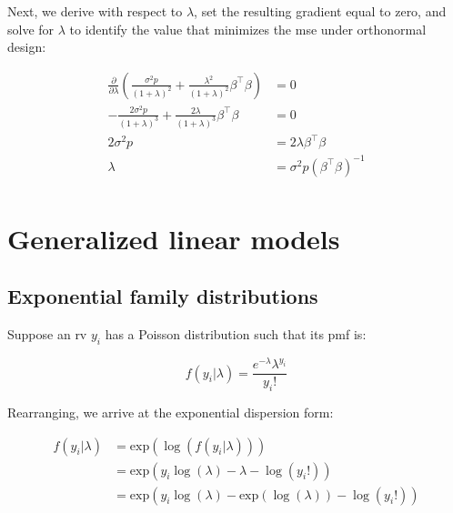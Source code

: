 \documentclass{report}
\begin{document}
Next, we derive with respect to $\lambda$, set the resulting gradient equal to zero, and solve for $\lambda$ to identify the value that minimizes the \gls{mse} under orthonormal design:

\begin{equation}\label{eq:ex-ridge-lambda-optimal}
    \begin{aligned}
        \frac{\partial}{\partial\lambda} \left(\frac{\sigma^2p}{(1+\lambda)^2} + \frac{\lambda^2}{(1+\lambda)^2} \beta^\intercal\beta\right) &= 0 \\
        -\frac{2\sigma^2p}{(1+\lambda)^3} + \frac{2\lambda}{(1+\lambda)^3} \beta^\intercal\beta &= 0 \\
        2\sigma^2p &= 2\lambda\beta^\intercal\beta \\
        \lambda &= \sigma^2p\left(\beta^\intercal\beta\right)^{-1} \\
    \end{aligned}
\end{equation}

\section{Generalized linear models}\label{sec:examples-glm}

\subsection{Exponential family distributions}

Suppose an \gls{rv} $y_i$ has a Poisson distribution such that its \gls{pmf} is:

\begin{equation}\label{eq:ex-glm-poisson-dist}
    f(y_i|\lambda) = \frac{e^{-\lambda}\lambda^{y_i}}{y_i!}
\end{equation}

Rearranging, we arrive at the exponential dispersion form:

\begin{equation}\label{eq:ex-glm-poisson-dist-exp-form}
    \begin{aligned}
        f(y_i|\lambda)
          &= \text{exp}(\log(f(y_i|\lambda))) \\
          &= \text{exp}(y_i\log(\lambda) - \lambda - \log(y_i!)) \\
          &= \text{exp}(y_i\log(\lambda) - \text{exp}(\log(\lambda)) - \log(y_i!)) \\
    \end{aligned}
\end{equation}
\end{document}
